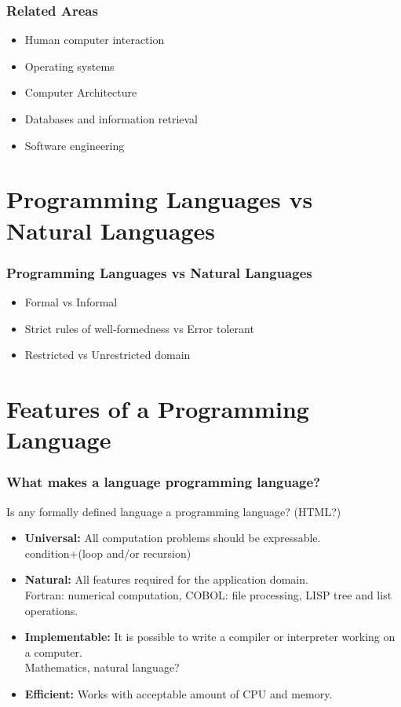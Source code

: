 \begin{frame}
 \frametitle{Related Areas}
\begin{itemize}
 \item Human computer interaction
\item Operating systems
\item Computer Architecture
\item Databases and information retrieval
\item Software engineering
\end{itemize}
\end{frame}

\section{Programming Languages vs Natural Languages}
\begin{frame}
 \frametitle{Programming Languages vs Natural Languages}
\begin{itemize}
 \item Formal vs Informal
\item Strict rules of well-formedness vs Error tolerant
\item Restricted vs Unrestricted domain
\end{itemize}
\end{frame}

\section{Features of a Programming Language}
\begin{frame}
 \frametitle{What makes a language programming language?}
Is any formally defined language a programming language?
(HTML?)
\begin{itemize}[<+->]
 \item \textbf{Universal:} All computation problems should be
expressable.\\ \pause
	condition+(loop and/or recursion)
\item \textbf{Natural:} All features required for the application domain.\\
	Fortran: numerical computation, COBOL: file processing, LISP tree and list operations.
\item \textbf{Implementable:} It is possible to write a compiler or interpreter working
on a computer.\\
Mathematics, natural language?
\item \textbf{Efficient:} Works with acceptable amount of CPU and memory.\\
\end{itemize}
\end{frame}

